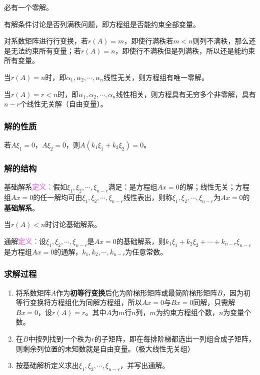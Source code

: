 必有一个零解。

有解条件讨论是否列满秩问题，即方程组是否能约束全部变量。

对系数矩阵进行行变换，若$r(A)=m$，即使行满秩若$m<n$则列不满秩，那么还是无法约束所有变量；若$r(A)=n$，即使行不满秩但是列满秩，所以还是能约束所有变量。

当$r(A)=n$时，即$\alpha_1,\alpha_2,\cdots,\alpha_n$线性无关，则方程组有唯一零解。

当$r(A)=r<n$时，即$\alpha_1,\alpha_2,\cdots,\alpha_n$线性相关，则方程具有无穷多个非零解，具有$n-r$个线性无关解（自由变量）。

\subsubsection{解的性质}

若$A\xi_1=0$，$A\xi_2=0$，则$A(k_1\xi_1+k_2\xi_2)=0$。

\subsubsection{解的结构}

基础解系\textcolor{violet}{\textbf{定义：}}假如$\xi_1,\xi_2,\cdots,\xi_{n-r}$满足：是方程组$Ax=0$的解；线性无关；方程组$Ax=0$的任一解均可由$\xi_1,\xi_2,\cdots,\xi_{n-r}$线性表出，则称$\xi_1,\xi_2,\cdots,\xi_{n-r}$为$Ax=0$的\textbf{基础解系}。

当$r(A)<n$时讨论基础解系。

通解\textcolor{violet}{\textbf{定义：}}设$\xi_1,\xi_2,\cdots,\xi_{n-r}$是$Ax=0$的基础解系，则$k_1\xi_1+k_2\xi_2+\cdots+k_{n-r}\xi_{n-r}$是方程组$Ax=0$的通解，$k_1,k_2,\cdots,k_{n-r}$为任意常数。

\subsubsection{求解过程}

\begin{enumerate}
    \item 将系数矩阵$A$作为\textbf{初等行变换}后化为阶梯形矩阵或最简阶梯形矩阵$B$，因为初等行变换将方程组化为同解方程组，所以$Ax=0$与$Bx=0$同解，只需解$Bx=0$，设$r(A)=r$。其中$A$为$m$行$n$列，$m$为约束方程组个数，$n$为变量个数。
    \item 在$B$中按列找到一个秩为$r$的子矩阵，即在每排阶梯都选出一列组合成子矩阵，则剩余列位置的未知数就是自由变量。（极大线性无关组）
    \item 按基础解析定义求出$\xi_1,\xi_2,\cdots,\xi_{n-r}$，并写出通解。
\end{enumerate}

